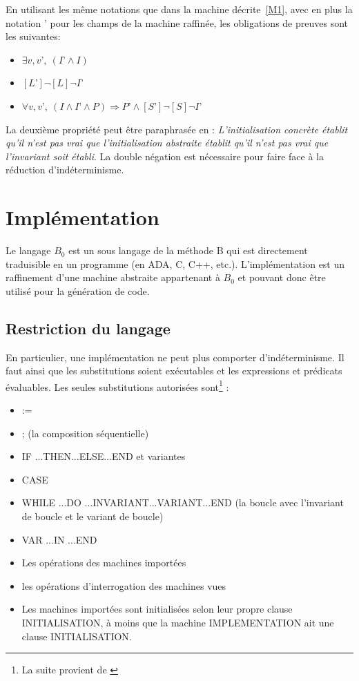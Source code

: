 \documentclass[10pt,a4paper]{article}
\begin{document}
{En utilisant les même notations que dans la machine décrite~\cref{M1}, avec en plus la notation ' pour les champs de la machine raffinée, les obligations de preuves sont les suivantes:
\begin{itemize}
\item $\exists v,v’,~ (I’ \wedge I) $
\item $[L’]\lnot[L]\lnot I’$
\item $\forall v,v’,~ (I \wedge I’ \wedge P) \Rightarrow P’ \wedge [S’]\lnot[S]\lnot I’$
\end{itemize}

La deuxième propriété peut être paraphrasée en : \emph{L'initialisation concrète établit qu'il n'est pas vrai que l'initialisation abstraite établit qu'il n'est pas vrai que l'invariant soit établi}\cite{habrias2006specifications}. La double négation est nécessaire pour faire face à la réduction d'indéterminisme.
\section{Implémentation}

Le langage $B_0$ est un sous langage de la méthode B qui est directement traduisible en un programme (en ADA, C, C++, etc.).
L'implémentation est un raffinement d'une machine abstraite appartenant à $B_0$ et pouvant donc être utilisé pour la génération de code.\\

\subsection{Restriction du langage}

En particulier, une implémentation ne peut plus comporter d'indéterminisme. Il faut ainsi que les substitutions soient exécutables et les expressions et prédicats évaluables.
Les seules substitutions autorisées sont\footnote{La suite provient de \cite{habrias2006specifications}} :
\begin{itemize}
\item :=
\item ; (la composition séquentielle)
\item IF ...THEN...ELSE...END et variantes
\item CASE
\item WHILE ...DO ...INVARIANT...VARIANT...END (la boucle avec l'invariant de boucle et le variant de boucle)
\item VAR ...IN ...END
\item Les opérations des machines importées
\item les opérations d'interrogation des machines vues
\item Les machines importées sont initialisées selon leur propre clause INITIALISATION, à moins que la machine IMPLEMENTATION ait une clause INITIALISATION.
\end{itemize}

}
\end{document}
